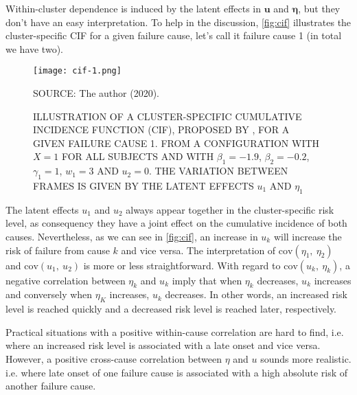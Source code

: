 Within-cluster dependence is induced by the latent effects in \(\bm{u}\)
and \(\bm{\eta}\), but they don't have an easy interpretation. To help
in the discussion, \autoref{fig:cif} illustrates the cluster-specific
CIF for a given failure cause, let's call it failure cause 1 (in total
we have two).

\begin{figure}[H]
  \setlength{\abovecaptionskip}{.0001pt}
  \caption{ILLUSTRATION OF A CLUSTER-SPECIFIC CUMULATIVE INCIDENCE
    FUNCTION (CIF), PROPOSED BY , FOR A GIVEN
    FAILURE CAUSE 1. FROM A CONFIGURATION WITH \(X = 1\) FOR ALL
    SUBJECTS AND WITH \(\beta_{1} = -1.9\), \(\beta_{2} = -0.2\),
    \(\gamma_{1} = 1\), \(w_{1} = 3\) AND \(u_{2} = 0\). THE VARIATION
    BETWEEN FRAMES IS GIVEN BY THE LATENT EFFECTS \(u_{1}\) AND
    \(\eta_{1}\)}
  \vspace{0.425cm} \centering
  \texttt{[image: cif-1.png]}
  \\
  \vspace{0.45cm}
  \begin{footnotesize}
    SOURCE: The author (2020).
  \end{footnotesize}
  \label{fig:cif}
\end{figure}

The latent effects \(u_{1}\) and \(u_{2}\) always appear together in the
cluster-specific risk level, as consequency they have a joint effect on
the cumulative incidence of both causes. Nevertheless, as we can see in
\autoref{fig:cif}, an increase in \(u_{k}\) will increase the risk of
failure from cause \(k\) and vice versa. The interpretation of
\(\text{cov}(\eta_{1},~\eta_{2})\) and \(\text{cov}(u_{1},~u_{2})\) is
more or less straightforward. With regard to
\(\text{cov}(u_{k},~\eta_{k})\), a negative correlation between
\(\eta_{k}\) and \(u_{k}\) imply that when \(\eta_{k}\) decreases,
\(u_{k}\) increases and conversely when \(\eta_{K}\) increases,
\(u_{k}\) decreases. In other words, an increased risk level is reached
quickly and a decreased risk level is reached later, respectively.

Practical situations with a positive within-cause correlation are hard
to find, i.e. where an increased risk level is associated with a late
onset and vice versa. However, a positive cross-cause correlation
between \(\eta\) and \(u\) sounds more realistic. i.e. where late onset
of one failure cause is associated with a high absolute risk of another
failure cause.

